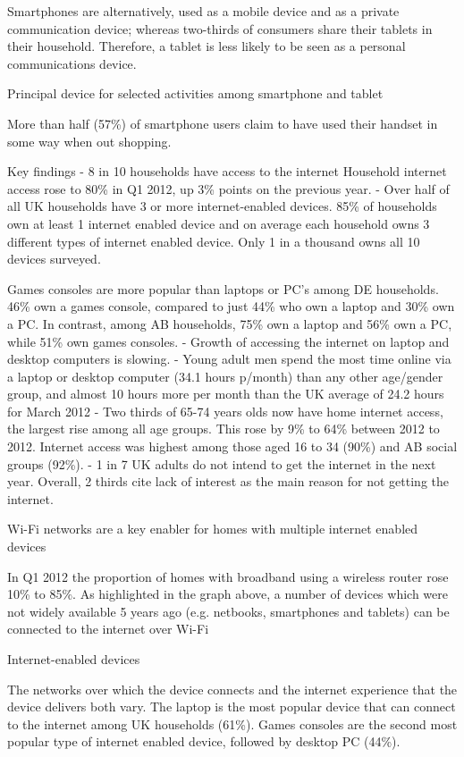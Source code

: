 \documentclass[letterpaper,10pt,openany,oneside,english]{sphinxmanual}
\begin{document}
Smartphones are alternatively, used as a mobile device and as a private communication device;
whereas two-thirds of consumers share their tablets in their household. Therefore, a tablet is
less likely to be seen as a personal communications device.

Principal device for selected activities among smartphone and tablet

More than half (57\%) of smartphone users claim to have used their handset in some way when
out shopping.

Key findings
- 8 in 10 households have access to the internet
Household internet access rose to 80\% in Q1 2012, up 3\% points on the previous year.
- Over half of all UK households have 3 or more internet-enabled devices.
85\% of households own at least 1 internet enabled device and on average each
household owns 3 different types of internet enabled device. Only 1 in a thousand owns
all 10 devices surveyed.

Games consoles are more popular than laptops or PC’s among DE households.
46\% own a games console, compared to just 44\% who own a laptop and 30\% own a PC.
In contrast, among AB households, 75\% own a laptop and 56\% own a PC, while 51\% own
games consoles.
- Growth of accessing the internet on laptop and desktop computers is slowing.
- Young adult men spend the most time online via a laptop or desktop computer (34.1
hours p/month) than any other age/gender group, and almost 10 hours more per month
than the UK average of 24.2 hours for March 2012
- Two thirds of 65-74 years olds now have home internet access, the largest rise among all
age groups. This rose by 9\% to 64\% between 2012 to 2012. Internet access was highest
among those aged 16 to 34 (90\%) and AB social groups (92\%).
- 1 in 7 UK adults do not intend to get the internet in the next year. Overall, 2 thirds cite
lack of interest as the main reason for not getting the internet.

Wi-Fi networks are a key enabler for homes with multiple internet enabled devices

In Q1 2012 the proportion of homes with broadband using a wireless router rose 10\% to 85\%.
As highlighted in the graph above, a number of devices which were not widely available 5 years
ago (e.g. netbooks, smartphones and tablets) can be connected to the internet over Wi-Fi

Internet-enabled devices

The networks over which the device connects and the internet experience that the device
delivers both vary. The laptop is the most popular device that can connect to the internet
among UK households (61\%). Games consoles are the second most popular type of internet
enabled device, followed by desktop PC (44\%).
\end{document}

